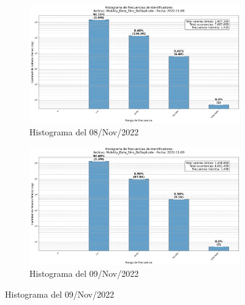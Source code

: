 \begin{figure}[htbp]
    \begin{subfigure}[t]{0.48\textwidth-1em}
        \includegraphics[width=\linewidth]{img/daily_histograms/histograma_identifier_Mobility_Data_Slim_DeDuplicate_2022-11-08.png}
        \caption{Histograma del 08/Nov/2022}
        \label{fig:sub3}
    \end{subfigure}
    \hfill
    \begin{subfigure}[t]{0.48\textwidth-1em}
        \includegraphics[width=\linewidth]{img/daily_histograms/histograma_identifier_Mobility_Data_Slim_DeDuplicate_2022-11-09.png}
        \caption{Histograma del 09/Nov/2022}
        \label{fig:sub4}
    \end{subfigure}
\end{figure}

